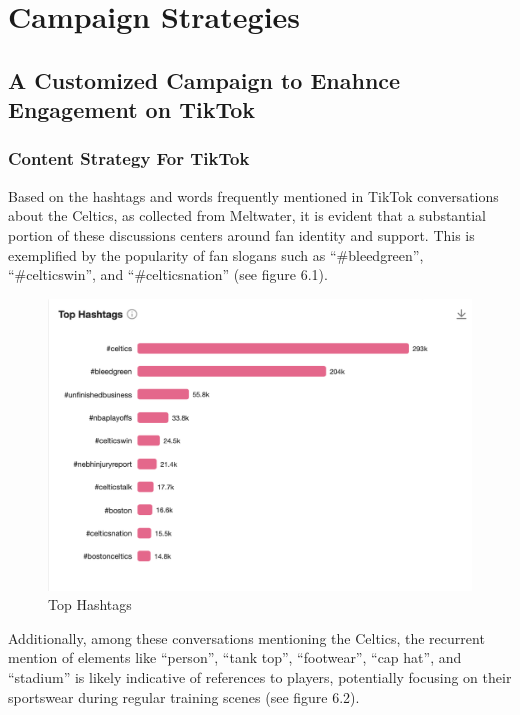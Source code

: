 \documentclass[
]{book}
\begin{document}
\hypertarget{campaign-strategies}{%
\chapter{Campaign Strategies}\label{campaign-strategies}}

\hypertarget{a-customized-campaign-to-enahnce-engagement-on-tiktok-1}{%
\section{A Customized Campaign to Enahnce Engagement on TikTok}\label{a-customized-campaign-to-enahnce-engagement-on-tiktok-1}}

\hypertarget{content-strategy-for-tiktok}{%
\subsection{Content Strategy For TikTok}\label{content-strategy-for-tiktok}}

Based on the hashtags and words frequently mentioned in TikTok conversations about the Celtics, as collected from Meltwater, it is evident that a substantial portion of these discussions centers around fan identity and support. This is exemplified by the popularity of fan slogans such as ``\#bleedgreen'', ``\#celticswin'', and ``\#celticsnation'' (see figure 6.1).

\begin{figure}
\centering
\includegraphics{4.png}
\caption{Top Hashtags}
\end{figure}

Additionally, among these conversations mentioning the Celtics, the recurrent mention of elements like ``person'', ``tank top'', ``footwear'', ``cap hat'', and ``stadium'' is likely indicative of references to players, potentially focusing on their sportswear during regular training scenes (see figure 6.2).
\end{document}
